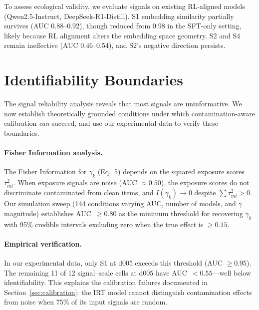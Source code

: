 \documentclass[11pt]{article}
\begin{document}
To assess ecological validity, we evaluate signals on existing RL-aligned models (Qwen2.5-Instruct, DeepSeek-R1-Distill).
S1 embedding similarity partially survives (AUC 0.88--0.92), though reduced from 0.98 in the SFT-only setting, likely because RL alignment alters the embedding space geometry.
S2 and S4 remain ineffective (AUC 0.46--0.54), and S2's negative direction persists.


\section{Identifiability Boundaries}
\label{sec:identifiability}

The signal reliability analysis reveals that most signals are uninformative.
We now establish theoretically grounded conditions under which contamination-aware calibration \emph{can} succeed, and use our experimental data to verify these boundaries.

\paragraph{Fisher Information analysis.}
The Fisher Information for $\gamma_k$ (Eq.~5) depends on the squared exposure scores $\tau_{mi}^2$.
When exposure signals are noise (AUC $\approx 0.50$), the exposure scores do not discriminate contaminated from clean items, and $I(\gamma_k) \to 0$ despite $\sum \tau_{mi}^2 > 0$.
Our simulation sweep (144 conditions varying AUC, number of models, and $\gamma$ magnitude) establishes AUC~$\geq 0.80$ as the minimum threshold for recovering $\gamma_k$ with 95\% credible intervals excluding zero when the true effect is $\geq 0.15$.

\paragraph{Empirical verification.}
In our experimental data, only S1 at d005 exceeds this threshold (AUC $\geq 0.95$).
The remaining 11 of 12 signal--scale cells at d005 have AUC~$< 0.55$---well below identifiability.
This explains the calibration failures documented in Section~\ref{sec:calibration}: the IRT model cannot distinguish contamination effects from noise when 75\% of its input signals are random.


\end{document}
